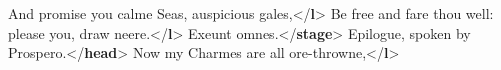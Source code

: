 \begin{shaded}
\hspace*{1em}\hspace*{1em}\hspace*{1em}And promise you calme Seas, auspicious gales,{</\textbf{l}>}\mbox{}\newline 
\hspace*{1em}\hspace*{1em}\hspace*{1em}Be free and fare thou well: please you, draw neere.{</\textbf{l}>}\mbox{}\newline 
\hspace*{1em}\hspace*{1em}\hspace*{1em}Exeunt omnes.{</\textbf{stage}>}\mbox{}\newline 
\hspace*{1em}\hspace*{1em}\mbox{}\newline 
\hspace*{1em}\mbox{}\newline 
{}\mbox{}\newline 
{}\mbox{}\newline 
\hspace*{1em}\mbox{}\newline 
\hspace*{1em}\hspace*{1em}Epilogue, spoken by Prospero.{</\textbf{head}>}\mbox{}\newline 
\hspace*{1em}\hspace*{1em}\mbox{}\newline 
\hspace*{1em}\hspace*{1em}\hspace*{1em}Now my Charmes are all ore-throwne,{</\textbf{l}>}\mbox{}\newline 

\end{shaded}
